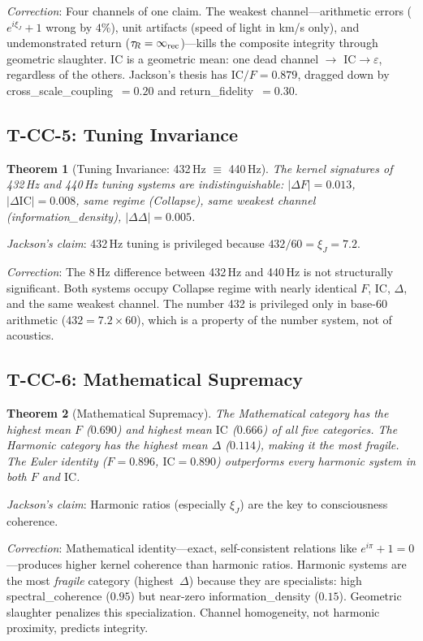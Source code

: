 \documentclass[
  aps,
  prd,
  twocolumn,
  superscriptaddress,
  nofootinbib,
  floatfix
]{revtex4-2}
\newtheorem{theorem}{Theorem}
\newcommand{\tR}{\tau_{\!R}}
\newcommand{\eps}{\varepsilon}
\newcommand{\IC}{\mathrm{IC}}
\newcommand{\xiJ}{\xi_J}
\begin{document}
\emph{Correction}: Four channels of one claim.  The weakest
channel---arithmetic errors ($e^{i\xiJ}+1$ wrong by $4\%$), unit
artifacts (speed of light in km/s only), and undemonstrated return
($\tR = \infty_{\rm rec}$)---kills the composite integrity through
geometric slaughter.  $\IC$ is a geometric mean: one dead channel $\to$
$\IC \to \eps$, regardless of the others.  Jackson's thesis has
$\IC/F = 0.879$, dragged down by cross\_scale\_coupling~$= 0.20$ and
return\_fidelity~$= 0.30$.

\subsection{T-CC-5: Tuning Invariance}

\begin{theorem}[Tuning Invariance: 432\,Hz $\equiv$ 440\,Hz]
The kernel signatures of 432\,Hz and 440\,Hz tuning systems are
indistinguishable: $|\Delta F| = 0.013$, $|\Delta\IC| = 0.008$,
same regime (Collapse), same weakest channel (information\_density),
$|\Delta\Delta| = 0.005$.
\end{theorem}

\emph{Jackson's claim}: 432\,Hz tuning is privileged because
$432/60 = \xiJ = 7.2$.

\emph{Correction}: The 8\,Hz difference between 432\,Hz and 440\,Hz is
not structurally significant.  Both systems occupy Collapse regime
with nearly identical $F$, $\IC$, $\Delta$, and the same weakest channel.
The number 432 is privileged only in base-60 arithmetic ($432 = 7.2
\times 60$), which is a property of the number system, not of acoustics.

\subsection{T-CC-6: Mathematical Supremacy}

\begin{theorem}[Mathematical Supremacy]
The Mathematical category has the highest mean $F$ ($0.690$) and highest
mean $\IC$ ($0.666$) of all five categories.  The Harmonic category has
the highest mean $\Delta$ ($0.114$), making it the most fragile.  The
Euler identity ($F = 0.896$, $\IC = 0.890$) outperforms every harmonic
system in both $F$ and $\IC$.
\end{theorem}

\emph{Jackson's claim}: Harmonic ratios (especially $\xiJ$) are the key
to consciousness coherence.

\emph{Correction}: Mathematical identity---exact, self-consistent
relations like $e^{i\pi}+1=0$---produces higher kernel coherence than
harmonic ratios.  Harmonic systems are the most \emph{fragile} category
(highest~$\Delta$) because they are specialists: high spectral\_coherence
($0.95$) but near-zero information\_density ($0.15$).  Geometric slaughter
penalizes this specialization.  Channel homogeneity, not harmonic proximity,
predicts integrity.
\end{document}
